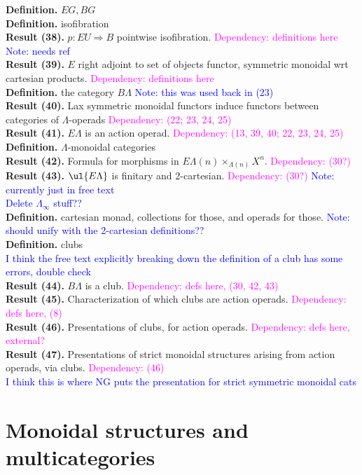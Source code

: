 \documentclass{amsart}
\begin{document}
\textbf{Definition.} $EG, BG$
\\ \textbf{Definition.} isofibration
\\ \textbf{Result (38).} $p:EU \Rightarrow B$ pointwise isofibration. \textcolor{magenta}{Dependency: definitions here} \textcolor{blue}{Note: needs ref}
\\ \textbf{Result (39).} $E$ right adjoint to set of objects functor, symmetric monoidal wrt cartesian products. \textcolor{magenta}{Dependency: definitions here}
\\ \textbf{Definition.} the category $B\Lambda$ \textcolor{blue}{Note: this was used back in (23)}
\\ \textbf{Result (40).} Lax symmetric monoidal functors induce functors between categories of $\Lambda$-operads \textcolor{magenta}{Dependency: (22; 23, 24, 25)}
\\ \textbf{Result (41).} $E\Lambda$ is an action operad. \textcolor{magenta}{Dependency: (13, 39, 40; 22, 23, 24, 25)}
\\ \textbf{Definition.} $\Lambda$-monoidal categories
\\ \textbf{Result (42).} Formula for morphisms in $E\Lambda(n) \times_{\Lambda(n)} X^n$. \textcolor{magenta}{Dependency: (30?)}
\\ \textbf{Result (43).} $\ul{E\Lambda}$ is finitary and 2-cartesian. \textcolor{magenta}{Dependency: (30?)} \textcolor{blue}{Note: currently just in free text}
\\ \textcolor{blue}{Delete $\Lambda_{\infty}$ stuff??}
\\ \textbf{Definition.} cartesian monad, collections for those, and operads for those. \textcolor{blue}{Note: should unify with the 2-cartesian definitions??}
\\ \textbf{Definition.} clubs
\\ \textcolor{blue}{I think the free text explicitly breaking down the definition of a club has some errors, double check}
\\ \textbf{Result (44).} $B\Lambda$ is a club. \textcolor{magenta}{Dependency: defs here, (30, 42, 43)}
\\ \textbf{Result (45).} Characterization of which clubs are action operads. \textcolor{magenta}{Dependency: defs here, (8)}
\\ \textbf{Result (46).} Presentations of clubs, for action operads. \textcolor{magenta}{Dependency: defs here, external?}
\\ \textbf{Result (47).} Presentations of strict monoidal structures arising from action operads, via clubs. \textcolor{magenta}{Dependency: (46)}
\\ \textcolor{blue}{I think this is where NG puts the presentation for strict symmetric monoidal cats}


\section{Monoidal structures and multicategories}
\end{document}
